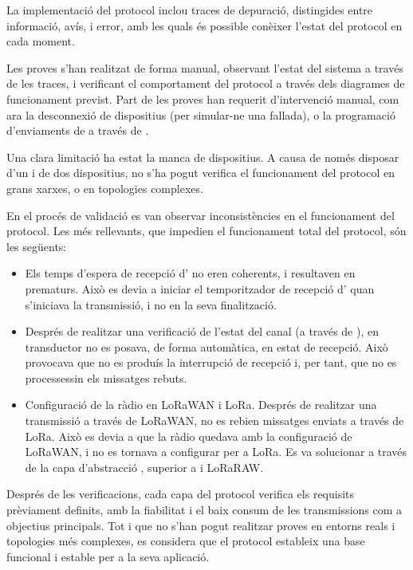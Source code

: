 \documentclass{tfgitic}[2024/07/01]
\begin{document}
{La implementació del protocol inclou traces de depuració, distingides entre informació, avís, i error, amb les quals és possible conèixer l'estat del protocol en cada moment. 

Les proves s'han realitzat de forma manual, observant l'estat del sistema a través de les traces, i verificant el comportament del protocol a través dels diagrames de funcionament previst. Part de les proves han requerit d'intervenció manual, com ara la desconnexió de dispositius (per simular-ne una fallada), o la programació d'enviaments de  a través de .

Una clara limitació ha estat la manca de dispositius. A causa de només disposar d'un  i de dos dispositius, no s'ha pogut verifica el funcionament del protocol en grans xarxes, o en topologies complexes. 



En el procés de validació es van observar inconsistències en el funcionament del protocol. Les més rellevants, que impedien el funcionament total del protocol, són les següents:
\begin{itemize}
    \item Els temps d'espera de recepció d' no eren coherents, i resultaven en  prematurs. Això es devia a iniciar el temporitzador de recepció d' quan s'iniciava la transmissió, i no en la seva finalització.
    \item Després de realitzar una verificació de l'estat del canal (a través de ), en transductor no es posava, de forma automàtica, en estat de recepció. Això provocava que no es produís la interrupció de recepció i, per tant, que no es processessin els missatges rebuts.
    \item Configuració de la ràdio en LoRaWAN i LoRa. Després de realitzar una transmissió a través de LoRaWAN, no es rebien missatges enviats a través de LoRa. Això es devia a que la ràdio quedava amb la configuració de LoRaWAN, i no es tornava a configurar per a LoRa. Es va solucionar a través de la capa d'abstracció , superior a  i {LoRaRAW}.
\end{itemize}

Després de les verificacions, cada capa del protocol verifica els requisits prèviament definits, amb la fiabilitat i el baix consum de les transmissions com a objectius principals. Tot i que no s'han pogut realitzar proves en entorns reals i topologies més complexes, es considera que el protocol estableix una base funcional i estable per a la seva aplicació.

}
\end{document}
